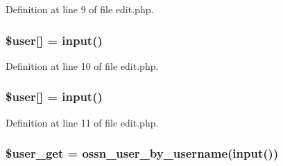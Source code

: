 Definition at line 9 of file edit.\+php.

\subsubsection[{\texorpdfstring{\$user}{$user}}]{\setlength{\rightskip}{0pt plus 5cm}\${\bf user}\mbox{[}\textquotesingle{}\mbox{]} = {\bf input}(\textquotesingle{})}\hypertarget{components_2_ossn_profile_2actions_2edit_8php_a332175f698fc3f3621ba3c118bbc1d47}{}\label{components_2_ossn_profile_2actions_2edit_8php_a332175f698fc3f3621ba3c118bbc1d47}


Definition at line 10 of file edit.\+php.

\subsubsection[{\texorpdfstring{\$user}{$user}}]{\setlength{\rightskip}{0pt plus 5cm}\${\bf user}\mbox{[}\textquotesingle{}\mbox{]} = {\bf input}(\textquotesingle{})}\hypertarget{components_2_ossn_profile_2actions_2edit_8php_a48c184d1487bdbc0b0d2fe6e1521dd7d}{}\label{components_2_ossn_profile_2actions_2edit_8php_a48c184d1487bdbc0b0d2fe6e1521dd7d}


Definition at line 11 of file edit.\+php.

\subsubsection[{\texorpdfstring{\$user\+\_\+get}{$user_get}}]{\setlength{\rightskip}{0pt plus 5cm}\$user\+\_\+get = {\bf ossn\+\_\+user\+\_\+by\+\_\+username}({\bf input}(\textquotesingle{}))}\hypertarget{components_2_ossn_profile_2actions_2edit_8php_a6851f6679565e5c254fb5b72c5ffe917}{}\label{components_2_ossn_profile_2actions_2edit_8php_a6851f6679565e5c254fb5b72c5ffe917}



